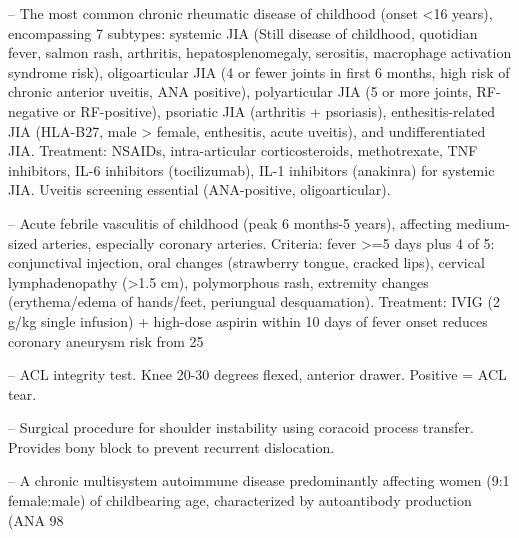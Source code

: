 -- The most common chronic rheumatic disease of childhood (onset <16 years), encompassing 7 subtypes: systemic JIA (Still disease of childhood, quotidian fever, salmon rash, arthritis, hepatosplenomegaly, serositis, macrophage activation syndrome risk), oligoarticular JIA (4 or fewer joints in first 6 months, high risk of chronic anterior uveitis, ANA positive), polyarticular JIA (5 or more joints, RF-negative or RF-positive), psoriatic JIA (arthritis + psoriasis), enthesitis-related JIA (HLA-B27, male > female, enthesitis, acute uveitis), and undifferentiated JIA. Treatment: NSAIDs, intra-articular corticosteroids, methotrexate, TNF inhibitors, IL-6 inhibitors (tocilizumab), IL-1 inhibitors (anakinra) for systemic JIA. Uveitis screening essential (ANA-positive, oligoarticular).

-- Acute febrile vasculitis of childhood (peak 6 months-5 years), affecting medium-sized arteries, especially coronary arteries. Criteria: fever >=5 days plus 4 of 5: conjunctival injection, oral changes (strawberry tongue, cracked lips), cervical lymphadenopathy (>1.5 cm), polymorphous rash, extremity changes (erythema/edema of hands/feet, periungual desquamation). Treatment: IVIG (2 g/kg single infusion) + high-dose aspirin within 10 days of fever onset reduces coronary aneurysm risk from 25%

-- ACL integrity test. Knee 20-30 degrees flexed, anterior drawer. Positive = ACL tear.

-- Surgical procedure for shoulder instability using coracoid process transfer. Provides bony block to prevent recurrent dislocation.

-- A chronic multisystem autoimmune disease predominantly affecting women (9:1 female:male) of childbearing age, characterized by autoantibody production (ANA 98%

